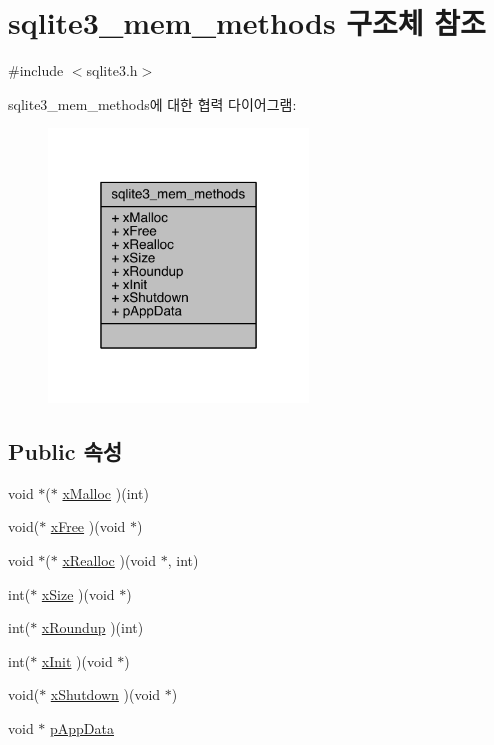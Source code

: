 \hypertarget{structsqlite3__mem__methods}{}\section{sqlite3\+\_\+mem\+\_\+methods 구조체 참조}
\label{structsqlite3__mem__methods}


{\ttfamily \#include $<$sqlite3.\+h$>$}



sqlite3\+\_\+mem\+\_\+methods에 대한 협력 다이어그램\+:
\nopagebreak
\begin{figure}[H]
\begin{center}
\leavevmode
\includegraphics[width=196pt]{structsqlite3__mem__methods__coll__graph}
\end{center}
\end{figure}
\subsection*{Public 속성}
\begin{DoxyCompactItemize}
\item 
void $\ast$($\ast$ \hyperlink{structsqlite3__mem__methods_a19aee06ad5c1c7041f55725b6adb2b18}{x\+Malloc} )(int)
\item 
void($\ast$ \hyperlink{structsqlite3__mem__methods_a17d4fe3177f86bd7b559ecadaa343ee8}{x\+Free} )(void $\ast$)
\item 
void $\ast$($\ast$ \hyperlink{structsqlite3__mem__methods_a82ef8b50d6b9920c1dadb3257cf36a3a}{x\+Realloc} )(void $\ast$, int)
\item 
int($\ast$ \hyperlink{structsqlite3__mem__methods_a703ec736e9ce21fd43b9602bcd07fa8e}{x\+Size} )(void $\ast$)
\item 
int($\ast$ \hyperlink{structsqlite3__mem__methods_aaf22c6bca12dc6a3f5851e2b6b59835d}{x\+Roundup} )(int)
\item 
int($\ast$ \hyperlink{structsqlite3__mem__methods_a870eddbe27d9062ed2fb49ba13233501}{x\+Init} )(void $\ast$)
\item 
void($\ast$ \hyperlink{structsqlite3__mem__methods_ae3b1f92553e714484515409eefec5c2f}{x\+Shutdown} )(void $\ast$)
\item 
void $\ast$ \hyperlink{structsqlite3__mem__methods_a390f66d08d5a480544e919f64d7713de}{p\+App\+Data}
\end{DoxyCompactItemize}


